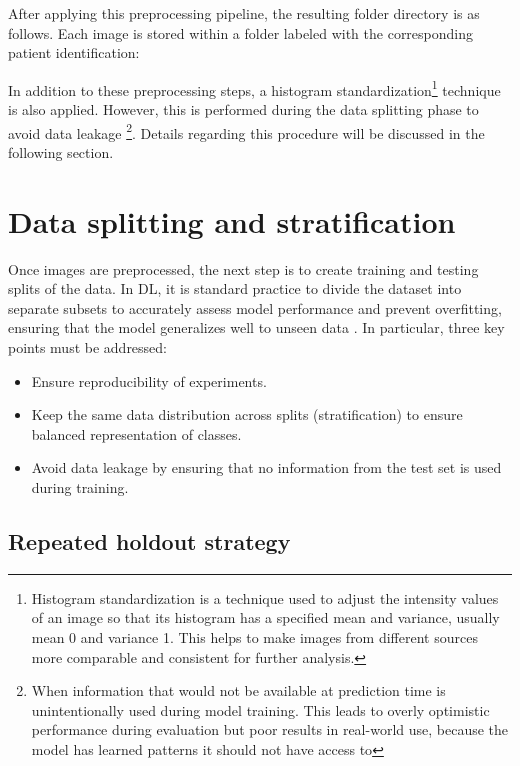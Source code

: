 \documentclass[a4paper,10pt]{book}
\begin{document}
After applying this preprocessing pipeline, the resulting folder directory is as follows. Each image is stored within a folder labeled with the corresponding patient identification:

\vspace{0.5cm}

In addition to these preprocessing steps, a histogram standardization\footnote{Histogram standardization is a technique used to adjust the intensity values of an image so that its histogram has a specified mean and variance, usually mean 0 and variance 1. This helps to make images from different sources more comparable and consistent for further analysis.} technique is also applied. However, this is performed during the data splitting phase to avoid data leakage \footnote{When information that would not be available at prediction time is unintentionally used during model training. This leads to overly optimistic performance during evaluation but poor results in real-world use, because the model has learned patterns it should not have access to}. Details regarding this procedure will be discussed in the following section.


\section{Data splitting and stratification}

Once images are preprocessed, the next step is to create training and testing splits of the data. In DL, it is standard practice to divide the dataset into separate subsets to accurately assess model performance and prevent overfitting, ensuring that the model generalizes well to unseen data \cite{noauthor_data_nodate}. In particular, three key points must be addressed:

\begin{itemize}
\item Ensure reproducibility of experiments.
\item Keep the same data distribution across splits (stratification) to ensure balanced representation of classes.
\item Avoid data leakage by ensuring that no information from the test set is used during training.
\end{itemize}

\subsection{Repeated holdout strategy}
\end{document}
